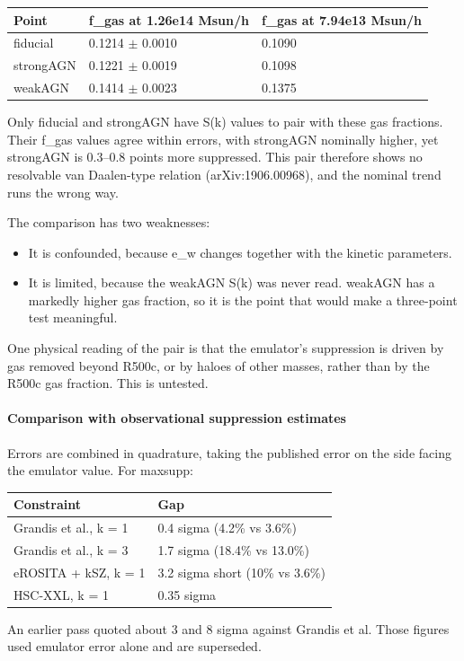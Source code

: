 \documentclass[11pt,a4paper]{article}
\begin{document}
\begin{longtable}{@{}p{}p{}p{}@{}}
\toprule
\textbf{Point} & \textbf{f\_gas at 1.26e14 Msun/h} & \textbf{f\_gas at 7.94e13 Msun/h} \\ \midrule \endhead
fiducial & 0.1214 $\pm$ 0.0010 & 0.1090 \\
strongAGN & 0.1221 $\pm$ 0.0019 & 0.1098 \\
weakAGN & 0.1414 $\pm$ 0.0023 & 0.1375 \\
\bottomrule\end{longtable}
Only fiducial and strongAGN have S(k) values to pair with these gas fractions. Their f\_gas values agree within errors, with strongAGN nominally higher, yet strongAGN is 0.3--0.8 points more suppressed. This pair therefore shows no resolvable van Daalen-type relation (arXiv:1906.00968), and the nominal trend runs the wrong way.

The comparison has two weaknesses:

\begin{itemize}
  \item It is confounded, because e\_w changes together with the kinetic parameters.
  \item It is limited, because the weakAGN S(k) was never read. weakAGN has a markedly higher gas fraction, so it is the point that would make a three-point test meaningful.
\end{itemize}
One physical reading of the pair is that the emulator's suppression is driven by gas removed beyond R500c, or by haloes of other masses, rather than by the R500c gas fraction. This is untested.

\paragraph{Comparison with observational suppression estimates}
Errors are combined in quadrature, taking the published error on the side facing the emulator value. For maxsupp:

\begin{longtable}{@{}p{}p{}@{}}
\toprule
\textbf{Constraint} & \textbf{Gap} \\ \midrule \endhead
Grandis et al., k = 1 & 0.4 sigma (4.2\% vs 3.6\%) \\
Grandis et al., k = 3 & 1.7 sigma (18.4\% vs 13.0\%) \\
eROSITA + kSZ, k = 1 & 3.2 sigma short (10\% vs 3.6\%) \\
HSC-XXL, k = 1 & 0.35 sigma \\
\bottomrule\end{longtable}
An earlier pass quoted about 3 and 8 sigma against Grandis et al. Those figures used emulator error alone and are superseded.
\end{document}
